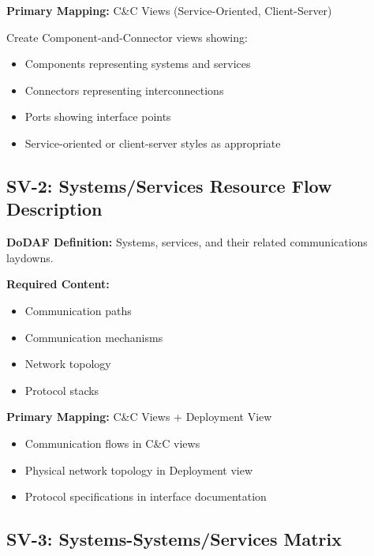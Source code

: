 \documentclass[11pt]{article}
\begin{document}
\begin{vbbox}
\textbf{Primary Mapping:} C\&C Views (Service-Oriented, Client-Server)

Create Component-and-Connector views showing:
\begin{itemize}
    \item Components representing systems and services
    \item Connectors representing interconnections
    \item Ports showing interface points
    \item Service-oriented or client-server styles as appropriate
\end{itemize}
\end{vbbox}

\subsection{SV-2: Systems/Services Resource Flow Description}

\begin{dodafbox}
\textbf{DoDAF Definition:} Systems, services, and their related communications laydowns.

\textbf{Required Content:}
\begin{itemize}[nosep]
    \item Communication paths
    \item Communication mechanisms
    \item Network topology
    \item Protocol stacks
\end{itemize}
\end{dodafbox}

\begin{vbbox}
\textbf{Primary Mapping:} C\&C Views + Deployment View

\begin{itemize}
    \item Communication flows in C\&C views
    \item Physical network topology in Deployment view
    \item Protocol specifications in interface documentation
\end{itemize}
\end{vbbox}

\subsection{SV-3: Systems-Systems/Services Matrix}
\end{document}
